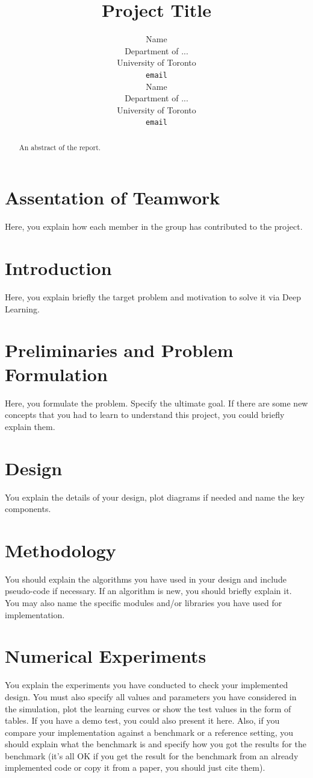 \documentclass{article}
\title{Project Title}
\author{%
  Name\\
  Department of ...\\
  University of Toronto\\
  \texttt{email} \\
  \And
  Name\\
  Department of ...\\
  University of Toronto\\
  \texttt{email} \\
}
\begin{document}
\maketitle


\begin{abstract}
An abstract of the report.
\end{abstract}

\section*{Assentation of Teamwork}
Here, you explain how each member in the group has contributed to the project.



\section{Introduction}
Here, you explain briefly the target problem and motivation to solve it via Deep Learning.

\section{Preliminaries and Problem Formulation}
Here, you formulate the problem. Specify the ultimate goal. If there are some new concepts that you had to learn to understand this project, you could briefly explain them.

\section{Design}
You explain the details of your design, plot diagrams if needed and name the key components.




\section{Methodology}
You should explain the algorithms you have used in your design and include pseudo-code if necessary. If an algorithm is new, you should briefly explain it. You may also name the specific modules and/or libraries you have used for implementation.


\section{Numerical Experiments}

You explain the experiments you have conducted to check your implemented design. You must also specify all values and parameters you have considered in the simulation, plot the learning curves or show the test values in the form of tables. If you have a demo test, you could also present it here. Also, if you compare your implementation against a benchmark or a reference setting, you should explain what the benchmark is and specify how you got the results for the benchmark (it's all OK if you get the result for the benchmark from an already implemented code or copy it from a paper, you should just cite them).
\end{document}
